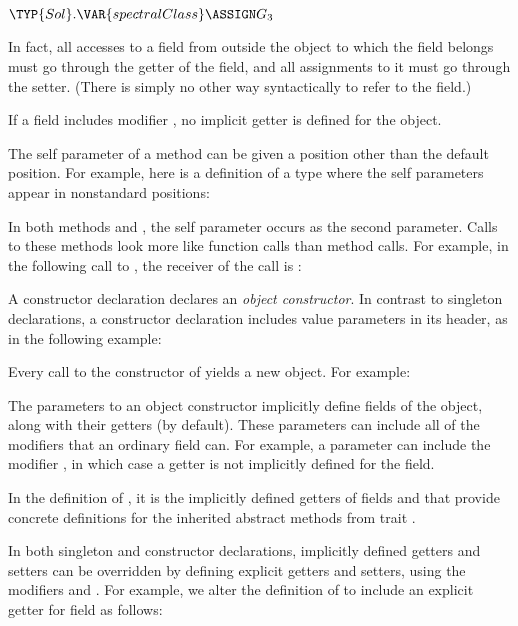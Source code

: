 \begin{Fortress}
\(\TYP{Sol}.\VAR{spectralClass} \ASSIGN G_{3}\)
\end{Fortress}

In fact,
all accesses to a field from outside the object to which the field belongs
must go through the getter of the field, and all assignments to it must go
through the setter. (There is simply no other way
syntactically to refer to the field.)

If a field includes modifier , no implicit getter is defined for the object.


The self parameter of a method can be given a position other than the default
position. For example, here is a definition of a type where the
self parameters appear in nonstandard positions:



In both methods  and , the self parameter occurs as the second parameter.
Calls to these methods look more like function calls than method calls. For example, in the following
call to , the receiver of the call is :




A constructor declaration declares an \emph{object constructor}.
In contrast to singleton declarations, a constructor declaration includes
value parameters in its header, as in the following example:
\label{particleDim}


Every call to the constructor of  yields a new object.
For example:


The parameters to an object constructor implicitly define
fields of the object, along with their getters (by default). These parameters
can include all of the modifiers that an ordinary field can. For example,
a parameter can include the modifier , in which case a getter
is not implicitly defined for the field.

In the definition of , it is the implicitly defined getters of
fields  and  that provide concrete definitions
for the inherited abstract methods from trait .

In both singleton and constructor declarations,
implicitly defined getters and setters can be overridden by defining
explicit getters and setters,
using the modifiers  and . For example,
we alter the definition
of  to include an explicit
getter for field  as follows:

